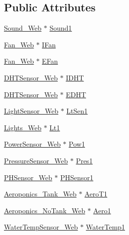 \subsection*{Public Attributes}
\begin{DoxyCompactItemize}
\item 
\hyperlink{class_sound___web}{Sound\+\_\+\+Web} $\ast$ \hyperlink{class_grow_box_aca5ba68e2366069df908907d02e2420b}{Sound1}
\item 
\hyperlink{class_fan___web}{Fan\+\_\+\+Web} $\ast$ \hyperlink{class_grow_box_aff731b9674e2160eaaba3f047db04dd2}{I\+Fan}
\item 
\hyperlink{class_fan___web}{Fan\+\_\+\+Web} $\ast$ \hyperlink{class_grow_box_a87780b88d908225de993eecd8a54950c}{E\+Fan}
\item 
\hyperlink{class_d_h_t_sensor___web}{D\+H\+T\+Sensor\+\_\+\+Web} $\ast$ \hyperlink{class_grow_box_a43f0777043fe13fd07f832d0436d5cdb}{I\+D\+HT}
\item 
\hyperlink{class_d_h_t_sensor___web}{D\+H\+T\+Sensor\+\_\+\+Web} $\ast$ \hyperlink{class_grow_box_a64d390b3296d48bdc7a14c1165dd745b}{E\+D\+HT}
\item 
\hyperlink{class_light_sensor___web}{Light\+Sensor\+\_\+\+Web} $\ast$ \hyperlink{class_grow_box_a28d76d5cbf31d6b2599462beb3c5a73b}{Lt\+Sen1}
\item 
\hyperlink{class_lights___web}{Lights\+\_\+\+Web} $\ast$ \hyperlink{class_grow_box_a0e999ef8584ed7f2d385ad8755a55af0}{Lt1}
\item 
\hyperlink{class_power_sensor___web}{Power\+Sensor\+\_\+\+Web} $\ast$ \hyperlink{class_grow_box_a3b1da631cb857ddfcbe6ecbbd6bb643a}{Pow1}
\item 
\hyperlink{class_pressure_sensor___web}{Pressure\+Sensor\+\_\+\+Web} $\ast$ \hyperlink{class_grow_box_aa1868c61de725635c872ebae62f9d3a6}{Pres1}
\item 
\hyperlink{class_p_h_sensor___web}{P\+H\+Sensor\+\_\+\+Web} $\ast$ \hyperlink{class_grow_box_a5a05648cf4487f017f282b1e66a19828}{P\+H\+Sensor1}
\item 
\hyperlink{class_aeroponics___tank___web}{Aeroponics\+\_\+\+Tank\+\_\+\+Web} $\ast$ \hyperlink{class_grow_box_a64282db7278b656dc7fdc0e0324f1f39}{Aero\+T1}
\item 
\hyperlink{class_aeroponics___no_tank___web}{Aeroponics\+\_\+\+No\+Tank\+\_\+\+Web} $\ast$ \hyperlink{class_grow_box_a7d1dc60bd64a668b7716696cdc67b560}{Aero1}
\item 
\hyperlink{class_water_temp_sensor___web}{Water\+Temp\+Sensor\+\_\+\+Web} $\ast$ \hyperlink{class_grow_box_a88f7a7dfabb1fbd40f70bcf0c1bba367}{Water\+Temp1}

\end{DoxyCompactItemize}
